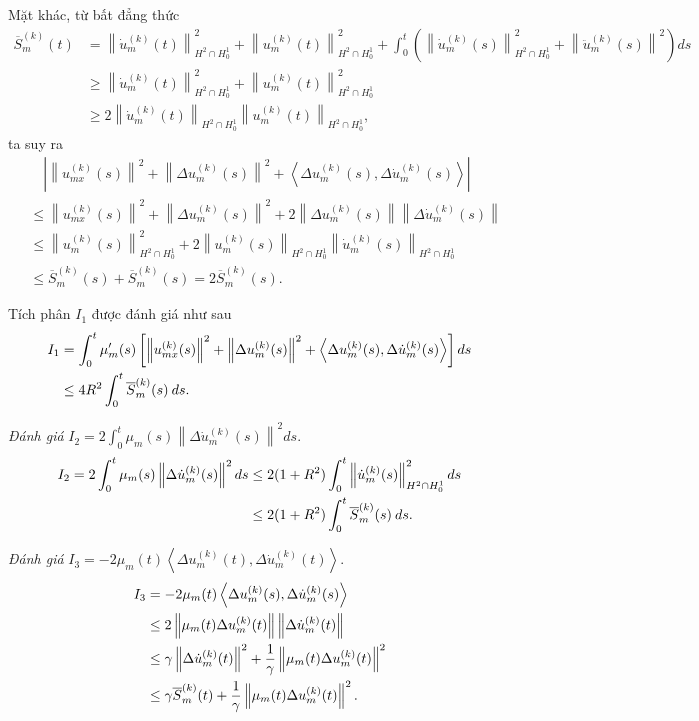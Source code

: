 \documentclass[12pt,a4paper]{article}
\theoremstyle{definition}
\theoremstyle{definition}
\begin{document}
Mặt khác, từ bất đẳng thức
\begin{align*}
    \overline{S}_m^{(k)}(t)
    &= \left\|\dot{u}_m^{(k)}(t)\right\|^2_{H^2 \cap H^1_0} + \left\|u_m^{(k)}(t)\right\|^2_{H^2 \cap H^1_0} + \int_0^t \left(\left\|\dot{u}_m^{(k)}(s)\right\|^2_{H^2 \cap H^1_0} + \left\|\ddot{u}_m^{(k)}(s)\right\|^2\right) ds \\
    &\ge \left\|\dot{u}_m^{(k)}(t)\right\|^2_{H^2 \cap H^1_0} + \left\|u_m^{(k)}(t)\right\|^2_{H^2 \cap H^1_0} \\
    &\ge 2 \left\|\dot{u}_m^{(k)}(t)\right\|_{H^2 \cap H^1_0} \left\|u_m^{(k)}(t)\right\|_{H^2 \cap H^1_0},
\end{align*}
ta suy ra
\begin{align*}
    &\quad \left|\left\|u_{mx}^{(k)}(s)\right\|^2 + \left\|\Delta u_m^{(k)}(s)\right\|^2 + \left<\Delta u_m^{(k)}(s), \Delta \dot{u}_m^{(k)}(s)\right>\right| \\
    &\le \left\|u_{mx}^{(k)}(s)\right\|^2 + \left\|\Delta u_m^{(k)}(s)\right\|^2 + 2 \left\|\Delta u_m^{(k)}(s)\right\| \left\|\Delta \dot{u}_m^{(k)}(s)\right\| \\
    &\le \left\|u_{m}^{(k)}(s)\right\|^2_{H^2 \cap H^1_0} + 2 \left\|u_m^{(k)}(s)\right\|_{H^2 \cap H^1_0} \left\|\dot{u}_m^{(k)}(s)\right\|_{H^2 \cap H^1_0} \\
    &\le \overline{S}_m^{(k)}(s) + \overline{S}_m^{(k)}(s) = 2 \overline{S}_m^{(k)}(s).
\end{align*}

Tích phân $I_1$ được đánh giá như sau
\begin{align}
    I_1 &= \int_0^t \mu'_m(s) \left[\left\|u_{mx}^{(k)}(s)\right\|^2 + \left\|\Delta u_m^{(k)}(s)\right\|^2 + \left<\Delta u_m^{(k)}(s), \Delta \dot{u}_m^{(k)}(s)\right>\right] ds \\
    &\le 4 R^2 \int_0^t \overline{S}_m^{(k)}(s) \: ds. \notag
\end{align}

\textit{Đánh giá} $\displaystyle I_2 = 2 \int_0^t \mu_m(s) \left\|\Delta \dot{u}_m^{(k)}(s)\right\|^2 ds$.
\begin{align}
    I_2 = 2 \int_0^t \mu_m(s) \left\|\Delta \dot{u}_m^{(k)}(s)\right\|^2 ds
    &\le 2 (1 + R^2) \int_0^t \left\|\dot{u}_m^{(k)}(s)\right\|^2_{H^2 \cap H^1_0} ds \\
    &\le 2 (1 + R^2) \int_0^t \overline{S}_m^{(k)}(s)\: ds. \notag
\end{align}

\textit{Đánh giá} $\displaystyle I_3 = - 2 \mu_m(t) \left<\Delta u_m^{(k)}(t), \Delta \dot{u}_m^{(k)}(t)\right>$.
\begin{align*}
    I_3 &= - 2 \mu_m(t) \left<\Delta u_m^{(k)}(s), \Delta \dot{u}_m^{(k)}(s)\right> \\
    &\le 2 \left\|\mu_m(t) \Delta u_m^{(k)}(t)\right\| \left\|\Delta \dot{u}_m^{(k)}(t)\right\| \notag \\
    &\le \gamma \left\|\Delta \dot{u}_m^{(k)}(t)\right\|^2 + \frac{1}{\gamma} \left\|\mu_m(t) \Delta u_m^{(k)}(t)\right\|^2 \notag \\
    &\le \gamma \overline{S}_m^{(k)}(t) + \frac{1}{\gamma} \left\|\mu_m(t) \Delta u_m^{(k)}(t)\right\|^2. \notag
\end{align*}
\end{document}
